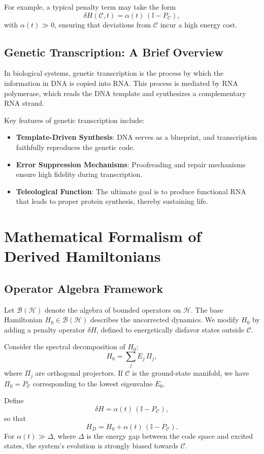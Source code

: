 \documentclass[11pt]{article}
\begin{document}
For example, a typical penalty term may take the form
\[
\delta H(\mathcal{C}, t) = \alpha(t) \, (\mathbb{I} - P_{\mathcal{C}}),
\]
with $\alpha(t) \gg 0$, ensuring that deviations from $\mathcal{C}$ incur a high energy cost.

\subsection{Genetic Transcription: A Brief Overview}
In biological systems, genetic transcription is the process by which the information in DNA is copied into RNA. This process is mediated by RNA polymerase, which reads the DNA template and synthesizes a complementary RNA strand.

Key features of genetic transcription include:
\begin{itemize}
    \item \textbf{Template-Driven Synthesis}: DNA serves as a blueprint, and transcription faithfully reproduces the genetic code.
    \item \textbf{Error Suppression Mechanisms}: Proofreading and repair mechanisms ensure high fidelity during transcription.
    \item \textbf{Teleological Function}: The ultimate goal is to produce functional RNA that leads to proper protein synthesis, thereby sustaining life.
\end{itemize}

\section{Mathematical Formalism of Derived Hamiltonians}
\subsection{Operator Algebra Framework}
Let $\mathcal{B}(\mathcal{H})$ denote the algebra of bounded operators on $\mathcal{H}$. The base Hamiltonian $H_0 \in \mathcal{B}(\mathcal{H})$ describes the uncorrected dynamics. We modify $H_0$ by adding a penalty operator $\delta H$, defined to energetically disfavor states outside $\mathcal{C}$.

Consider the spectral decomposition of $H_0$:
\[
H_0 = \sum_{j} E_j \, \Pi_j,
\]
where $\Pi_j$ are orthogonal projectors. If $\mathcal{C}$ is the ground-state manifold, we have $\Pi_0 = P_{\mathcal{C}}$ corresponding to the lowest eigenvalue $E_0$.

Define
\[
\delta H = \alpha(t) \, (\mathbb{I} - P_{\mathcal{C}}),
\]
so that
\[
H_D = H_0 + \alpha(t) \, (\mathbb{I} - P_{\mathcal{C}}).
\]
For $\alpha(t) \gg \Delta$, where $\Delta$ is the energy gap between the code space and excited states, the system's evolution is strongly biased towards $\mathcal{C}$.
\end{document}
